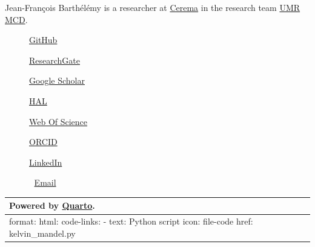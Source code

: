 \documentclass[
  a4paper,
  numbers=noendperiod,
  DIV=12]{scrreprt}
\newcounter{none} %
\begin{document}

Jean-François Barthélémy is a researcher at
\href{https://www.cerema.fr/en}{Cerema} in the research team
\href{https://mcd.univ-gustave-eiffel.fr/}{UMR MCD}.

\begin{figure}

\begin{minipage}[t]{0.25\linewidth}
\href{https://github.com/jfbarthelemy}{GitHub}\end{minipage}%
%
\begin{minipage}[t]{0.25\linewidth}
\href{https://www.researchgate.net/profile/Jean-Francois_Barthelemy}{ResearchGate}\end{minipage}%
%
\begin{minipage}[t]{0.25\linewidth}
\href{https://scholar.google.com/citations?user=RVjtCiAAAAAJ&hl=en}{Google
Scholar}\end{minipage}%
%
\begin{minipage}[t]{0.25\linewidth}
\href{https://hal.archives-ouvertes.fr/search/index/?q=\%2A&authIdHal_s=jfbarthelemy}{HAL}\end{minipage}%
\newline
\begin{minipage}[t]{0.25\linewidth}
\href{https://www.webofscience.com/wos/author/record/449919}{Web Of
Science}\end{minipage}%
%
\begin{minipage}[t]{0.25\linewidth}
\end{minipage}%
%
\begin{minipage}[t]{0.25\linewidth}

 \href{https://orcid.org/0000-0002-1968-8939}{ORCID}

\end{minipage}%
%
\begin{minipage}[t]{0.25\linewidth}
\href{https://www.linkedin.com/in/jean-fran\%C3\%A7ois-barth\%C3\%A9l\%C3\%A9my-75b3122/}{LinkedIn}\end{minipage}%
\newline
\begin{minipage}[t]{0.25\linewidth}
📩 \href{mailto:jf.barthelemy@cerema.fr}{Email}\end{minipage}%

\end{figure}%

{\def\LTcaptype{none} %
\begin{longtable}[]{@{}
  >{\raggedright\arraybackslash}p{}@{}}
\toprule\noalign{}
\begin{minipage}[b]{\linewidth}\raggedright
Powered by \href{https://quarto.org/}{Quarto}.
\end{minipage} \\
\midrule\noalign{}
\endhead
\bottomrule\noalign{}
\endlastfoot
format: html: code-links: - text: Python script icon: file-code href:
kelvin\_mandel.py \\
\end{longtable}
}
\end{document}
